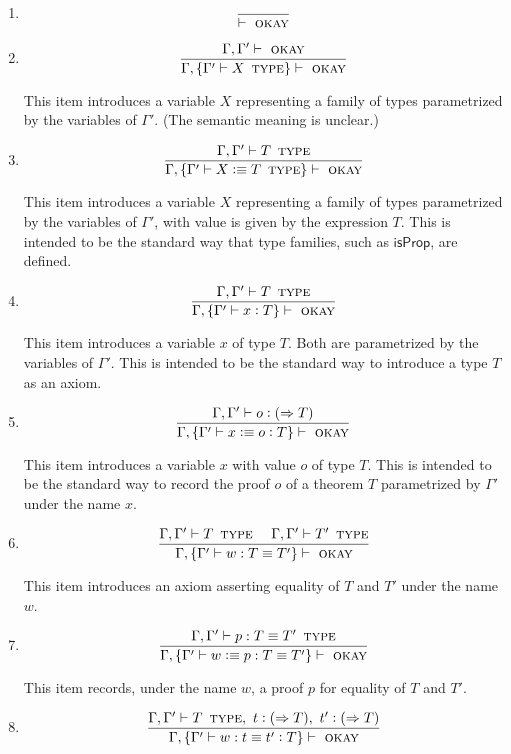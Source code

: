\documentclass[11pt]{article}
\newcommand{\eqd}{\equiv}
\newcommand{\spc}{{\,\,\,\,\,\,\,}}
\newcommand{\ccolon}[1]{\vcentcolon#1}
\newcommand{\synth}[1]{\vcentcolon(\Rightarrow#1)} %
\newcommand{\Type}{\mathop{\text{ \sc type}}}
\newcommand{\Okay}{\mathop{\text{ \sc okay}}}
\newcommand{\defn}{\vcentcolon\equiv}
\begin{document}
\begin{enumerate}

\item
$$\frac{}{\vdash\Okay}$$

\item
$$\frac{\Gamma,\Gamma'\vdash \Okay}{\Gamma,\{\Gamma' \vdash X \Type \} \vdash\Okay}$$

This item introduces a variable $X$ representing a family of types parametrized by
the variables of $\Gamma'$.  (The semantic meaning is unclear.)

\item
$$\frac{\Gamma,\Gamma'\vdash T \Type }{\Gamma,\{\Gamma' \vdash X \defn T \Type \} \vdash\Okay}$$

This item introduces a variable $X$ representing a family of types parametrized by
the variables of $\Gamma'$, with value is given by the expression $T$.  This is
intended to be the standard way that type families, such as $\mathsf{isProp}$,
are defined.

\item
$$\frac{\Gamma,\Gamma'\vdash T \Type}{\Gamma,\{\Gamma' \vdash x \ccolon{T} \} \vdash\Okay}$$

This item introduces a variable $x$ of type $T$.  Both are parametrized by the
variables of $\Gamma'$.  This is intended to be the standard way to introduce a
type $T$ as an axiom.

\item
$$\frac{\Gamma,\Gamma'\vdash o \synth T}{\Gamma,\{\Gamma' \vdash x \defn o \ccolon{T} \} \vdash\Okay}$$

This item introduces a variable $x$ with value $o$ of type $T$. This is
intended to be the standard way to record the proof $o$ of a theorem $T$
parametrized by $\Gamma'$ under the name $x$.

\item
$$\frac{\Gamma,\Gamma'\vdash T \Type \spc \Gamma,\Gamma'\vdash T' \Type}{\Gamma,\{\Gamma' \vdash w : T \eqd T' \} \vdash\Okay}$$

This item introduces an axiom asserting equality of $T$ and $T'$ under the name $w$.

\item
$$\frac{\Gamma,\Gamma'\vdash p : T \eqd T' \Type}{\Gamma,\{\Gamma' \vdash w \defn p : T \eqd T' \} \vdash\Okay}$$

This item records, under the name $w$, a proof $p$ for equality of $T$ and $T'$.

\item
$$\frac{\Gamma,\Gamma'\vdash T \Type,~ t \synth{T},~ t' \synth{T}}{\Gamma,\{\Gamma' \vdash w : t \eqd t' \ccolon{T} \} \vdash\Okay}$$


\end{enumerate}
\end{document}

